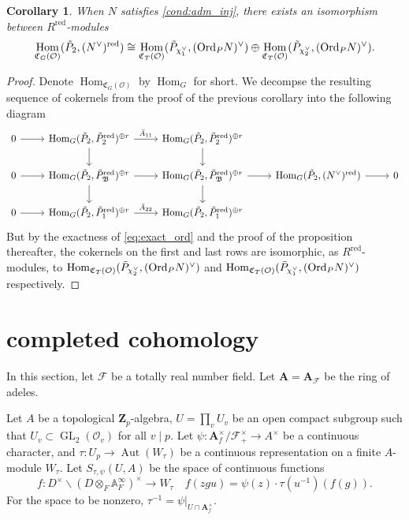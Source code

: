 \documentclass[leqno]{amsart}
\newcommand{\Ord}{\textnormal{Ord}}
\DeclareMathOperator{\red}{red}
\DeclareMathOperator{\GL}{GL}
\newcommand{\Zp}{\mathbf{Z}_p}
\newcommand{\A}{\mathbf A}
\newcommand{\F}{{\mathcal{F}}} %
\newcommand{\oo}{\mathcal O}
\newcommand{\1}{\mathbf{1}}
\newcommand{\fC}{\mathfrak C}
\newcommand{\B}{\mathfrak B}
\DeclareMathOperator{\Hom}{Hom}
\DeclareMathOperator{\Aut}{Aut}
\newtheorem{cor}[thm]{Corollary}
\theoremstyle{definition}
\theoremstyle{remark}
\begin{document}
\begin{cor}
	When $N$ satisfies \eqref{cond:adm_inj}, 
	there exists an isomorphism between $R^{\red}$-modules
    \begin{equation*}
	    \Hom_{\fC_{G}(\oo)}(\tilde{P}_2,(N^\vee)^{\red})\cong
	    \Hom_{\fC_{T}(\oo)}(\tilde{P}_{\chi_1^\vee}, (\Ord_PN)^\vee)\oplus
	    \Hom_{\fC_{T}(\oo)}(\tilde{P}_{\chi_2^\vee},(\Ord_PN)^\vee).
    \end{equation*}
\end{cor}
\begin{proof}
	Denote $\Hom_{\fC_{G}(\oo)}$ by $\Hom_G$ for short.
	We decompse the resulting sequence of cokernels
	from the proof of the previous corollary into the following diagram
\begin{equation*}
    \begin{tikzcd}
	    0 \arrow[r]& \Hom_{G}(\tilde{P}_2, \tilde{P}_2^{\red})^{\oplus r}
	    \arrow[r,"\bar{A}_{11}"] \arrow[d]&
	    \Hom_{G}(\tilde{P}_2, \tilde{P}_2^{\red})^{\oplus r}
	    \arrow[d] &&\\
	    0\arrow[r] & \Hom_{G}(\tilde{P}_2, \tilde{P}_\B^{\red})^{\oplus r}
	    \arrow[r] 
	    \arrow[d] &
	    \Hom_{G}(\tilde{P}_2, \tilde{P}_\B^{\red})^{\oplus r}
	    \arrow[d] \arrow[r]&
	    \Hom_{G}(\tilde{P}_2, (N^\vee)^{\red})\arrow[r]&0\\
	    0\arrow[r] & \Hom_{G}(\tilde{P}_2, \tilde{P}_1^{\red})^{\oplus r}
	    \arrow[r,"\bar{A}_{22}"] &
	    \Hom_{G}(\tilde{P}_2, \tilde{P}_1^{\red})^{\oplus r}&&
    \end{tikzcd}
\end{equation*}
But by the exactness of \eqref{eq:exact_ord}
and the proof of the proposition thereafter,
the cokernels on the first and last rows
are isomorphic, as  $R^{\red}$-modules,
to $\Hom_{\fC_T(\oo)}(\tilde{P}_{\chi_2^\vee}, (\Ord_PN)^\vee)$ and
$\Hom_{\fC_T(\oo)}(\tilde{P}_{\chi_1^\vee}, (\Ord_PN)^\vee)$ respectively.
\end{proof}  

\section{completed cohomology}

In this section, let $\F$ be a totally real number field.
Let $\A=\A_\F$ be the ring of adeles.

Let $A$ be a topological  $\Zp$-algebra,
$U=\prod_vU_v$ be an open compact subgroup
such that  $U_v\subset \GL_2(\oo_v)$ for all  $v\mid p$.
Let $\psi\colon \A_f^\times/\F_+^\times\to A^\times$ 
be a continuous character,
and  $\tau\colon U_p\to \Aut(W_\tau)$
be a continuous representation on a finite  $A$-module  $W_\tau$.
Let $S_{\tau, \psi}(U, A)$ be the space of continuous functions
\[
f: D^{\times} \backslash(D \otimes_F \mathbb{A}_F^{\infty})^{\times} \rightarrow W_\tau
\quad f(zgu)=\psi(z)\cdot \tau(u^{-1})(f(g)).
\]
For the space to be nonzero, 
$\tau^{-1}=\psi|_{U\cap \A_f^\times}$.
\end{document}
